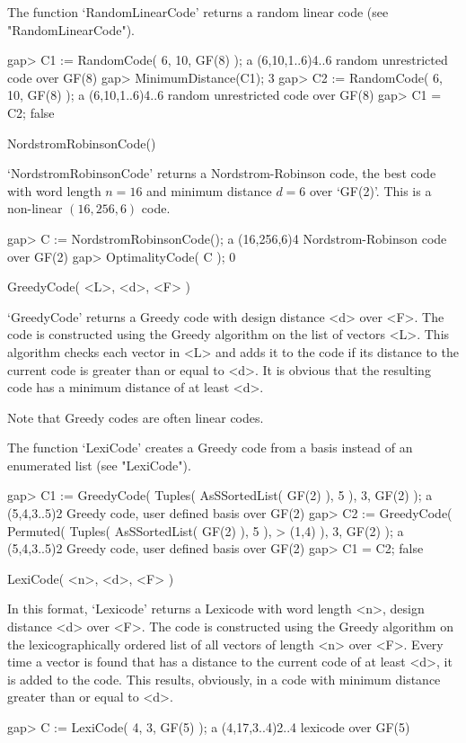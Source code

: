 The   function  `RandomLinearCode' returns  a    random linear code  (see
"RandomLinearCode"). 

\beginexample
gap> C1 := RandomCode( 6, 10, GF(8) );
a (6,10,1..6)4..6 random unrestricted code over GF(8)
gap> MinimumDistance(C1);
3
gap> C2 := RandomCode( 6, 10, GF(8) );
a (6,10,1..6)4..6 random unrestricted code over GF(8)
gap> C1 = C2;
false 
\endexample

\>NordstromRobinsonCode()

`NordstromRobinsonCode' returns a  Nordstrom-Robinson code, the best code
with word length $n=16$ and minimum distance  $d=6$ over `GF(2)'. This is
a non-linear $(16, 256, 6)$ code.

\beginexample
gap> C := NordstromRobinsonCode();
a (16,256,6)4 Nordstrom-Robinson code over GF(2)
gap> OptimalityCode( C );
0 
\endexample

\>GreedyCode( <L>, <d>, <F> )

`GreedyCode' returns a Greedy code with design distance <d> over <F>. The
code is  constructed using the  Greedy algorithm  on the  list of vectors
<L>. This algorithm checks each vector in <L> and  adds it to the code if
its distance to the current  code is greater than  or equal to <d>. It is
obvious that the resulting code has a minimum distance of at least <d>.

Note that Greedy codes are often linear codes.

The function `LexiCode' creates a Greedy code  from a basis instead of an
enumerated list (see "LexiCode").

\beginexample
gap> C1 := GreedyCode( Tuples( AsSSortedList( GF(2) ), 5 ), 3, GF(2) );
a (5,4,3..5)2 Greedy code, user defined basis over GF(2)
gap> C2 := GreedyCode( Permuted( Tuples( AsSSortedList( GF(2) ), 5 ),
>                         (1,4) ), 3, GF(2) );
a (5,4,3..5)2 Greedy code, user defined basis over GF(2)
gap> C1 = C2;
false 
\endexample

\>LexiCode( <n>, <d>, <F> )

In this format, `Lexicode'  returns  a Lexicode   with word length   <n>,
design distance <d>  over <F>. The code is  constructed using  the Greedy
algorithm on the lexicographically ordered  list of all vectors of length
<n> over <F>.   Every time a vector  is found that has  a distance to the
current code  of  at least <d>,  it is  added to the  code. This results,
obviously, in a code with minimum distance greater than or equal to <d>.

\beginexample
gap> C := LexiCode( 4, 3, GF(5) );
a (4,17,3..4)2..4 lexicode over GF(5) 
\endexample

